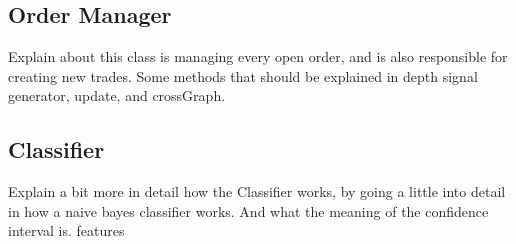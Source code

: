 \subsection{Order Manager}
Explain about this class is managing every open order, and is also responsible for creating new trades. Some methods that should be explained in depth signal generator, update, and crossGraph.

\subsection{Classifier}
Explain a bit more in detail how the Classifier works, by going a little into detail in how a naive bayes classifier works. And what the meaning of the confidence interval is.
features